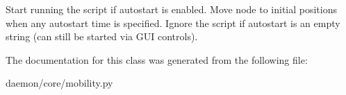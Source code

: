 \begin{DoxyVerb}Start running the script if autostart is enabled.
    Move node to initial positions when any autostart time is specified.
    Ignore the script if autostart is an empty string (can still be
    started via GUI controls).
\end{DoxyVerb}
 

The documentation for this class was generated from the following file\+:\begin{DoxyCompactItemize}
\item 
daemon/core/mobility.\+py\end{DoxyCompactItemize}
